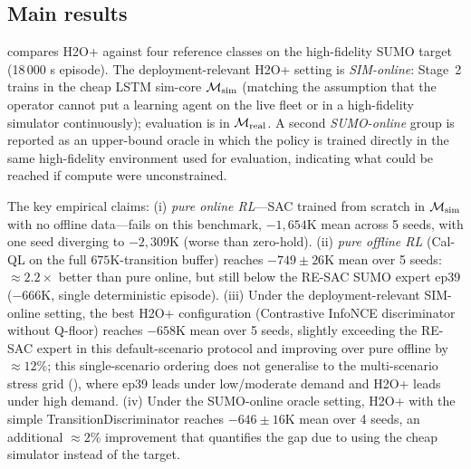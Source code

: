 \subsection{Main results}
\label{sec:exp:main}

 compares H2O+ against four reference classes on the high-fidelity SUMO target (18\,000 s episode).
The deployment-relevant H2O+ setting is \emph{SIM-online}: Stage~2 trains in the cheap LSTM sim-core $\mathcal{M}_{\mathrm{sim}}$ (matching the assumption that the operator cannot put a learning agent on the live fleet or in a high-fidelity simulator continuously); evaluation is in $\mathcal{M}_{\mathrm{real}}$.
A second \emph{SUMO-online} group is reported as an upper-bound oracle in which the policy is trained directly in the same high-fidelity environment used for evaluation, indicating what could be reached if compute were unconstrained.

The key empirical claims:
(i) \emph{pure online RL}---SAC trained from scratch in $\mathcal{M}_{\mathrm{sim}}$ with no offline data---fails on this benchmark, $-1{,}654$K mean across 5 seeds, with one seed diverging to $-2{,}309$K (worse than zero-hold).
(ii) \emph{pure offline RL} (Cal-QL on the full $675$K-transition buffer) reaches $-749 \pm 26$K mean over 5 seeds: $\approx 2.2\times$ better than pure online, but still below the RE-SAC SUMO expert ep39 ($-666$K, single deterministic episode).
(iii) Under the deployment-relevant SIM-online setting, the best H2O+ configuration (Contrastive InfoNCE discriminator without Q-floor) reaches $-658$K mean over 5 seeds, slightly exceeding the RE-SAC expert in this default-scenario protocol and improving over pure offline by $\approx 12\%$; this single-scenario ordering does not generalise to the multi-scenario stress grid (), where ep39 leads under low/moderate demand and H2O+ leads under high demand.
(iv) Under the SUMO-online oracle setting, H2O+ with the simple TransitionDiscriminator reaches $-646 \pm 16$K mean over 4 seeds, an additional $\approx 2\%$ improvement that quantifies the gap due to using the cheap simulator instead of the target.


